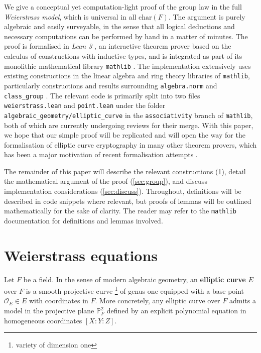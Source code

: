 \documentclass[a4paper,UKenglish,cleveref,autoref,thm-restate]{lipics-v2021}
\begin{document}
We give a conceptual yet computation-light proof of the group law in the full \emph{Weierstrass model}, which is universal in all $ \mathrm{char}(F) $. The argument is purely algebraic and easily surveyable, in the sense that all logical deductions and necessary computations can be performed by hand in a matter of minutes. The proof is formalised in \emph{Lean 3} \cite{lean}, an interactive theorem prover based on the calculus of constructions with inductive types, and is integrated as part of its monolithic mathematical library \texttt{mathlib} \cite{mathlib}. The implementation extensively uses existing constructions in the linear algebra and ring theory libraries of \texttt{mathlib}, particularly constructions and results surrounding \texttt{algebra.norm} and \texttt{class\_group} \cite{docs}. The relevant code is primarily split into two files \texttt{weierstrass.lean} and \texttt{point.lean} under the folder \texttt{algebraic\_geometry/elliptic\_curve} in the \texttt{associativity} branch of \texttt{mathlib}, both of which are currently undergoing reviews for their merge. With this paper, we hope that our simple proof will be replicated and will open the way for the formalisation of elliptic curve cryptography in many other theorem provers, which has been a major motivation of recent formalisation attempts \cite{russinoff, fox, hales, bartzia}.

The remainder of this paper will describe the relevant constructions (\cref{sec:weierstrass}), detail the mathematical argument of the proof (\cref{sec:group}), and discuss implementation considerations (\cref{sec:discuss}). Throughout, definitions will be described in code snippets where relevant, but proofs of lemmas will be outlined mathematically for the sake of clarity. The reader may refer to the \texttt{mathlib} documentation \cite{docs} for definitions and lemmas involved.

\pagebreak

\section{Weierstrass equations}
\label{sec:weierstrass}

Let $ F $ be a field. In the sense of modern algebraic geometry, an \textbf{elliptic curve} $ E $ over $ F $ is a smooth projective curve \footnote{variety of dimension one} of genus one equipped with a base point $ \mathcal{O}_E \in E $ with coordinates in $ F $. More concretely, any elliptic curve over $ F $ admits a model in the projective plane $ \mathbb{P}_F^2 $ defined by an explicit polynomial equation in homogeneous coordinates $ [X : Y : Z] $.
\end{document}
